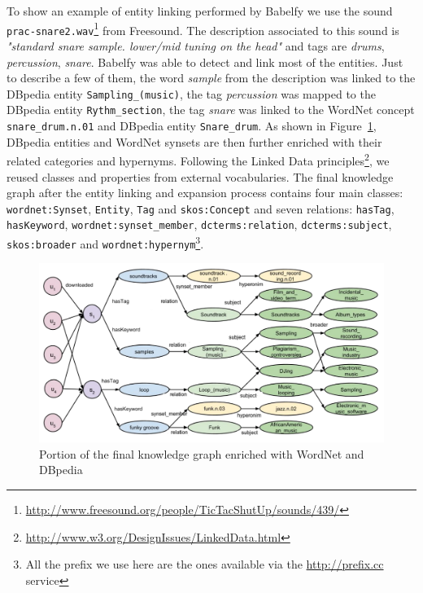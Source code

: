 To show an example of entity linking performed by Babelfy we use the sound \texttt{prac-snare2.wav}\footnote{\url{http://www.freesound.org/people/TicTacShutUp/sounds/439/}} from Freesound. The description associated to this sound is \textit{"standard snare sample. lower/mid tuning on the head"} and tags are \textit{drums}, \textit{percussion}, \textit{snare}. Babelfy was able to detect and link most of the entities. Just to describe a few of them, the word \textit{sample} from the description was linked to the DBpedia entity \texttt{Sampling\_(music)}, the tag \textit{percussion} was mapped to the DBpedia entity \texttt{Rythm\_section}, the tag \textit{snare} was linked to the WordNet concept \texttt{snare\_drum.n.01} and DBpedia entity \texttt{Snare\_drum}. As shown in Figure~\ref{fig:graph-rec:graph_enhancement}, DBpedia entities and WordNet synsets are then further enriched with their related categories and hypernyms. Following the Linked Data principles\footnote{\url{http://www.w3.org/DesignIssues/LinkedData.html}}, we reused classes and properties from external vocabularies. The final knowledge graph after the entity linking and expansion process contains four main classes: \texttt{wordnet:Synset}, \texttt{Entity}, \texttt{Tag} and \texttt{skos:Concept} and seven relations: \texttt{hasTag}, \texttt{hasKeyword}, \texttt{wordnet:synset\_member}, \texttt{dcterms:relation}, \texttt{dcterms:subject}, \texttt{skos:broader} and \texttt{wordnet:hypernym}\footnote{All the prefix we use here are the ones available via the \url{http://prefix.cc} service}.


\begin{figure}
\centering
\includegraphics[width=\textwidth]{ch07_graph-rec_pics/graph_all_final2.pdf}
\caption{Portion of the final knowledge graph enriched with WordNet and DBpedia \label{fig:graph-rec:graph_enhancement}}
\end{figure}


